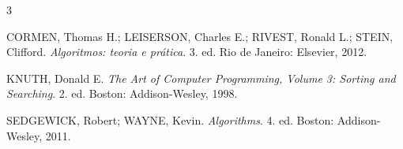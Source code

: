 \begingroup
\renewcommand{\refname}{}
\vspace{-2.5em}
\begin{thebibliography}{3}

CORMEN, Thomas H.; LEISERSON, Charles E.; RIVEST, Ronald L.; STEIN, Clifford. \textit{Algoritmos: teoria e prática}. 3. ed. Rio de Janeiro: Elsevier, 2012.

KNUTH, Donald E. \textit{The Art of Computer Programming, Volume 3: Sorting and Searching}. 2. ed. Boston: Addison-Wesley, 1998.

SEDGEWICK, Robert; WAYNE, Kevin. \textit{Algorithms}. 4. ed. Boston: Addison-Wesley, 2011.

\end{thebibliography}
\endgroup